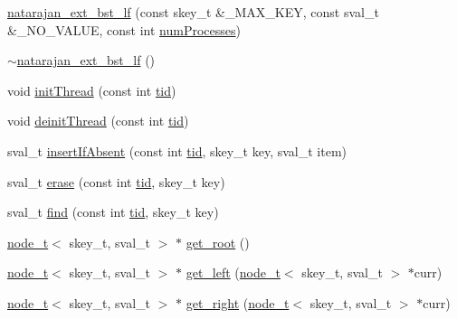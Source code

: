 \begin{DoxyCompactItemize}
\item 
\hyperlink{classnatarajan__ext__bst__lf_a3004e0b831b62ffbe50fce8c0bccdd53}{natarajan\+\_\+ext\+\_\+bst\+\_\+lf} (const skey\+\_\+t \&\+\_\+\+M\+A\+X\+\_\+\+K\+EY, const sval\+\_\+t \&\+\_\+\+N\+O\+\_\+\+V\+A\+L\+UE, const int \hyperlink{testing_8cpp_aa085812188e21ede75351d88b9b2c30d}{num\+Processes})
\item 
\hyperlink{classnatarajan__ext__bst__lf_a3dfa7398463b014b9a1a86d4068dd7a5}{$\sim$natarajan\+\_\+ext\+\_\+bst\+\_\+lf} ()
\item 
void \hyperlink{classnatarajan__ext__bst__lf_a6e3a0c6117221f806dde9c903c90c9b6}{init\+Thread} (const int \hyperlink{microbench_2main_8cpp_a9ca9869868fe7e7a38a921cc7de4103f}{tid})
\item 
void \hyperlink{classnatarajan__ext__bst__lf_a51fbc22d01b758dad5a4a64d1d7e62bc}{deinit\+Thread} (const int \hyperlink{microbench_2main_8cpp_a9ca9869868fe7e7a38a921cc7de4103f}{tid})
\item 
sval\+\_\+t \hyperlink{classnatarajan__ext__bst__lf_acee96bf831b747c5c9c2541c5101f506}{insert\+If\+Absent} (const int \hyperlink{microbench_2main_8cpp_a9ca9869868fe7e7a38a921cc7de4103f}{tid}, skey\+\_\+t key, sval\+\_\+t item)
\item 
sval\+\_\+t \hyperlink{classnatarajan__ext__bst__lf_a4e26b944d7a22b38c367a5a9272a65df}{erase} (const int \hyperlink{microbench_2main_8cpp_a9ca9869868fe7e7a38a921cc7de4103f}{tid}, skey\+\_\+t key)
\item 
sval\+\_\+t \hyperlink{classnatarajan__ext__bst__lf_aaca04e90b6cd390c3cf5701a08bcdb51}{find} (const int \hyperlink{microbench_2main_8cpp_a9ca9869868fe7e7a38a921cc7de4103f}{tid}, skey\+\_\+t key)
\item 
\hyperlink{structnode__t}{node\+\_\+t}$<$ skey\+\_\+t, sval\+\_\+t $>$ $\ast$ \hyperlink{classnatarajan__ext__bst__lf_aa6b371791b726b19343e1a6c64d38f92}{get\+\_\+root} ()
\item 
\hyperlink{structnode__t}{node\+\_\+t}$<$ skey\+\_\+t, sval\+\_\+t $>$ $\ast$ \hyperlink{classnatarajan__ext__bst__lf_ab75e566e3b6845734860439339da0a29}{get\+\_\+left} (\hyperlink{structnode__t}{node\+\_\+t}$<$ skey\+\_\+t, sval\+\_\+t $>$ $\ast$curr)
\item 
\hyperlink{structnode__t}{node\+\_\+t}$<$ skey\+\_\+t, sval\+\_\+t $>$ $\ast$ \hyperlink{classnatarajan__ext__bst__lf_ae8d692e12e9ddc4bb5f986b500ff96b4}{get\+\_\+right} (\hyperlink{structnode__t}{node\+\_\+t}$<$ skey\+\_\+t, sval\+\_\+t $>$ $\ast$curr)

\end{DoxyCompactItemize}
